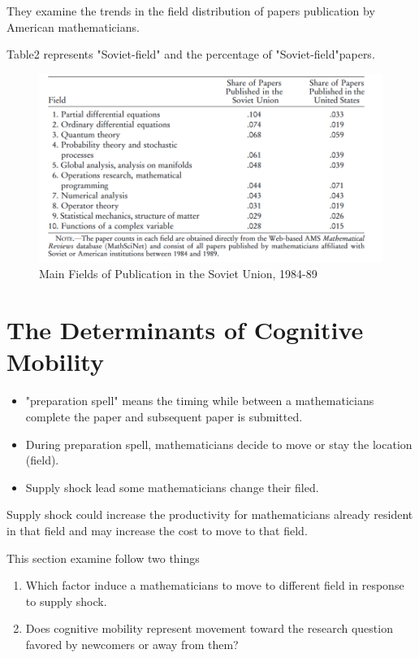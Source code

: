 \documentclass[../root]{subfiles}
\begin{document}
    They examine the trends in the field distribution of papers publication  by American mathematicians.
    
    Table2 represents "Soviet-field" and the percentage of "Soviet-field"papers. 
    \begin{figure}
        \centering
        \includegraphics[width = \linewidth]{_images/0918sugiyama/Table_2.png}
        \caption{Main Fields of Publication in the Soviet Union, 1984-89}
        \label{fig:my_label}
    \end{figure}
   
   
   \section{The Determinants of Cognitive Mobility}
   
   \begin{itemize}
       \item "preparation spell" means the timing while  between a mathematicians complete the paper and subsequent paper is submitted.
       \item During preparation spell, mathematicians decide to move or stay the location (field).
       \item Supply shock lead some mathematicians change their filed.
   \end{itemize}
     
     Supply shock could increase the productivity for mathematicians already resident in that field and may increase the cost to move to that field.
   
   This section examine follow two things
   \begin{enumerate}
       \item  Which factor induce a mathematicians to move to different field in response to supply shock.
       \item Does cognitive mobility represent movement toward the research question favored by newcomers or away from them? 
   \end{enumerate}
       
\end{document}
